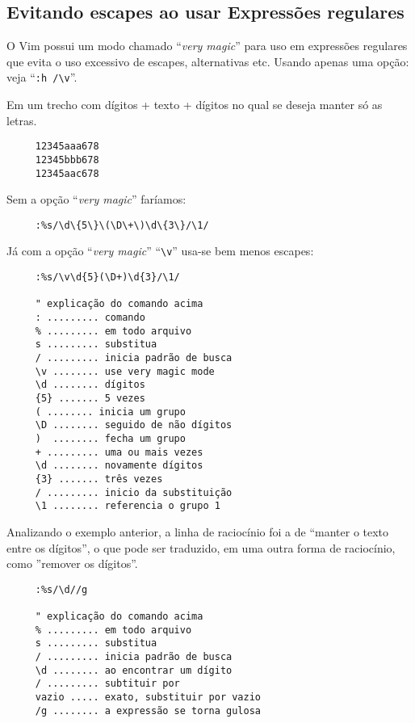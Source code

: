 \subsection{Evitando escapes ao usar Expressões regulares}

O Vim possui um modo chamado ``{\em very magic}'' para uso em expressões
regulares que evita o uso excessivo de escapes, alternativas etc. Usando apenas
uma opção: veja ``\verb+:h /\v+''.

Em um trecho com dígitos + texto + dígitos
no qual se deseja manter só as letras.

\begin{verbatim}
     12345aaa678
     12345bbb678
     12345aac678
\end{verbatim}

Sem a opção ``{\em very magic}'' faríamos:

\begin{verbatim}
     :%s/\d\{5\}\(\D\+\)\d\{3\}/\1/
\end{verbatim}

Já com a opção ``{\em very magic}'' ``\verb+\v+'' usa-se bem menos escapes:

\begin{verbatim}
     :%s/\v\d{5}(\D+)\d{3}/\1/

     " explicação do comando acima
     : ......... comando
     % ......... em todo arquivo
     s ......... substitua
     / ......... inicia padrão de busca
     \v ........ use very magic mode
     \d ........ dígitos
     {5} ....... 5 vezes 
     ( ........ inicia um grupo
     \D ........ seguido de não dígitos
     )  ........ fecha um grupo     
     + ......... uma ou mais vezes
     \d ........ novamente dígitos
     {3} ....... três vezes 
     / ......... inicio da substituição
     \1 ........ referencia o grupo 1
\end{verbatim}

Analizando o exemplo anterior, a linha de raciocínio foi a de ``manter o texto entre os
dígitos'', o que pode ser traduzido, em uma outra forma de raciocínio, como ''remover os
dígitos''.

\begin{verbatim}
     :%s/\d//g

     " explicação do comando acima
     % ......... em todo arquivo
     s ......... substitua
     / ......... inicia padrão de busca
     \d ........ ao encontrar um dígito
     / ......... subtituir por
     vazio ..... exato, substituir por vazio
     /g ........ a expressão se torna gulosa
\end{verbatim}

